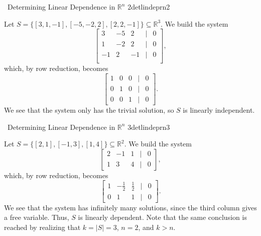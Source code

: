             \begin{example}{\Difficulty\,\Difficulty\,\,Determining Linear Dependence in \(\mathbb{R}^n\) 2}{detlindeprn2}
                
                Let \(S=\{[3,1,-1],[-5,-2,2],[2,2,-1]\}\subseteq\mathbb{R}^3\). We build the system
                \begin{equation*}
                    \begin{bmatrix}
                        3 & -5 & 2 & | & 0 \\
                        1 & -2 & 2 & | & 0 \\
                        -1 & 2 & -1 & | & 0 \\
                    \end{bmatrix},
                \end{equation*}
                which, by row reduction, becomes
                \begin{equation*}
                    \begin{bmatrix}
                        1 & 0 & 0 & | & 0 \\
                        0 & 1 & 0 & | & 0 \\
                        0 & 0 & 1 & | & 0
                    \end{bmatrix}.
                \end{equation*}
                We see that the system only has the trivial solution, so \(S\) is linearly independent.

            \end{example}
            \begin{example}{\Difficulty\,\Difficulty\,\,Determining Linear Dependence in \(\mathbb{R}^n\) 3}{detlindeprn3}
                
                Let \(S=\{[2,1],[-1,3],[1,4]\}\subseteq\mathbb{R}^2\). We build the system
                \begin{equation*}
                    \begin{bmatrix}
                        2 & -1 & 1 & | & 0 \\
                        1 & 3 & 4 & | & 0
                    \end{bmatrix},
                \end{equation*}
                which, by row reduction, becomes
                \begin{equation*}
                    \begin{bmatrix}
                        1 & -\frac{1}{2} & \frac{1}{2} & | & 0 \\
                        0 & 1 & 1 & | & 0
                    \end{bmatrix}.
                \end{equation*}
                We see that the system has infinitely many solutions, since the third column gives a free variable. Thus, \(S\) is linearly dependent. Note that the same conclusion is reached by realizing that \(k=|S|=3\), \(n=2\), and \(k>n\).

            \end{example}

